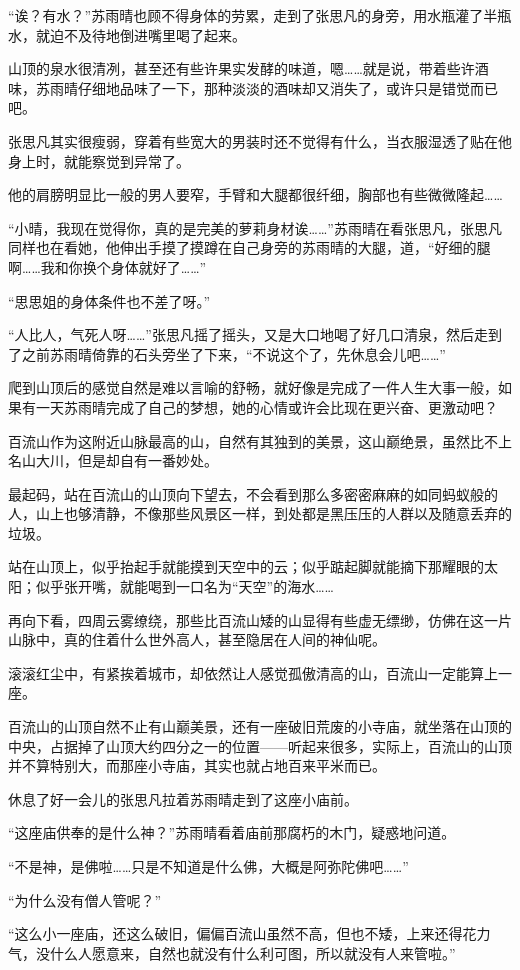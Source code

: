 “诶？有水？”苏雨晴也顾不得身体的劳累，走到了张思凡的身旁，用水瓶灌了半瓶水，就迫不及待地倒进嘴里喝了起来。

山顶的泉水很清冽，甚至还有些许果实发酵的味道，嗯……就是说，带着些许酒味，苏雨晴仔细地品味了一下，那种淡淡的酒味却又消失了，或许只是错觉而已吧。

张思凡其实很瘦弱，穿着有些宽大的男装时还不觉得有什么，当衣服湿透了贴在他身上时，就能察觉到异常了。

他的肩膀明显比一般的男人要窄，手臂和大腿都很纤细，胸部也有些微微隆起……

“小晴，我现在觉得你，真的是完美的萝莉身材诶……”苏雨晴在看张思凡，张思凡同样也在看她，他伸出手摸了摸蹲在自己身旁的苏雨晴的大腿，道，“好细的腿啊……我和你换个身体就好了……”

“思思姐的身体条件也不差了呀。”

“人比人，气死人呀……”张思凡摇了摇头，又是大口地喝了好几口清泉，然后走到了之前苏雨晴倚靠的石头旁坐了下来，“不说这个了，先休息会儿吧……”

爬到山顶后的感觉自然是难以言喻的舒畅，就好像是完成了一件人生大事一般，如果有一天苏雨晴完成了自己的梦想，她的心情或许会比现在更兴奋、更激动吧？

百流山作为这附近山脉最高的山，自然有其独到的美景，这山巅绝景，虽然比不上名山大川，但是却自有一番妙处。

最起码，站在百流山的山顶向下望去，不会看到那么多密密麻麻的如同蚂蚁般的人，山上也够清静，不像那些风景区一样，到处都是黑压压的人群以及随意丢弃的垃圾。

站在山顶上，似乎抬起手就能摸到天空中的云；似乎踮起脚就能摘下那耀眼的太阳；似乎张开嘴，就能喝到一口名为“天空”的海水……

再向下看，四周云雾缭绕，那些比百流山矮的山显得有些虚无缥缈，仿佛在这一片山脉中，真的住着什么世外高人，甚至隐居在人间的神仙呢。

滚滚红尘中，有紧挨着城市，却依然让人感觉孤傲清高的山，百流山一定能算上一座。

百流山的山顶自然不止有山巅美景，还有一座破旧荒废的小寺庙，就坐落在山顶的中央，占据掉了山顶大约四分之一的位置——听起来很多，实际上，百流山的山顶并不算特别大，而那座小寺庙，其实也就占地百来平米而已。

休息了好一会儿的张思凡拉着苏雨晴走到了这座小庙前。

“这座庙供奉的是什么神？”苏雨晴看着庙前那腐朽的木门，疑惑地问道。

“不是神，是佛啦……只是不知道是什么佛，大概是阿弥陀佛吧……”

“为什么没有僧人管呢？”

“这么小一座庙，还这么破旧，偏偏百流山虽然不高，但也不矮，上来还得花力气，没什么人愿意来，自然也就没有什么利可图，所以就没有人来管啦。”

